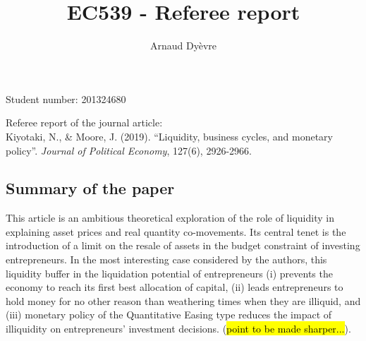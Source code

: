 \documentclass{amsart}
\theoremstyle{definition}
\theoremstyle{remark}
\numberwithin{equation}{section}
\begin{document}
\title{EC539 - Referee report}

\author{Arnaud Dy\`evre}







\maketitle

\begin{center}
Student number: 201324680
\end{center}


\vspace{12pt}

Referee report of the journal article: \\ 
Kiyotaki, N., \& Moore, J. (2019). ``Liquidity, business cycles, and monetary policy''. \textit{Journal of Political Economy}, 127(6), 2926-2966.

\newpage 

\subsection*{Summary of the paper} This article is an ambitious theoretical exploration of the role of liquidity in explaining asset prices and real quantity co-movements. Its central tenet is the introduction of a limit on the resale of assets in the budget constraint of investing entrepreneurs. In the most interesting case considered by the authors, this liquidity buffer in the liquidation potential of entrepreneurs (i) prevents the economy to reach its first best allocation of capital, (ii) leads entrepreneurs to hold money for no other reason than weathering times when they are illiquid, and (iii) monetary policy of the Quantitative Easing type reduces the impact of illiquidity on entrepreneurs' investment decisions. (\hl{point to be made sharper...}).\\
\end{document}
